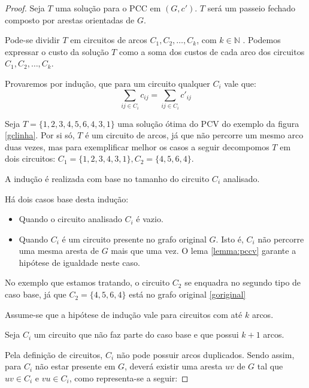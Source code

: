         \begin{proof} 
            Seja $T$ uma solução para o PCC em $(G, c')$. 
            $T$ será um passeio fechado composto por arestas orientadas de $G$.

            Pode-se dividir $T$ em circuitos de arcos $C_1, C_2, \dots, C_k$, com $k \in \mathbb{N}$ . %
            Podemos expressar o custo da solução $T$ como a soma dos custos de cada arco dos circuitos $C_1, C_2, \dots, C_k$. 

            Provaremos por indução, que para um circuito qualquer $C_i$ vale que:
            \[
                \sum_{ij \in C_i} c_{ij} = \sum_{ij \in C_i} c'_{ij}
            \]

            Seja $T = \{1, 2, 3, 4, 5, 6, 4, 3, 1\}$ uma solução ótima do PCV do exemplo da figura \ref{gclinha}.
            Por si só, $T$ é um circuito de arcos, já que não percorre um mesmo arco duas vezes, mas para exemplificar melhor os casos a seguir decompomos $T$ em dois circuitos: $C_1 = \{1, 2, 3, 4, 3, 1\}, C_2 = \{4, 5, 6, 4\}$.

            A indução é realizada com base no tamanho do circuito $C_i$ analisado.

            Há dois casos base desta indução:

            \begin{itemize}
                \item Quando o circuito analisado $C_i$ é vazio.
                \item Quando $C_i$ é um circuito presente no grafo original $G$. 
                    Isto é, $C_i$ não percorre uma mesma aresta de $G$ mais que uma vez.
                    O lema \ref{lemma:pccv} garante a hipótese de igualdade neste caso.
            \end{itemize}

            No exemplo que estamos tratando, o circuito $C_2$ se enquadra no segundo tipo de caso base, já que $C_2 = \{4, 5, 6, 4\}$ está no grafo original \ref{goriginal}

            Assume-se que a hipótese de indução vale para circuitos com até $k$ arcos.

            Seja $C_i$ um circuito que não faz parte do caso base e que possui $k+1$ arcos.

            Pela definição de circuitos, $C_i$ não pode possuir arcos duplicados.  
            Sendo assim, para $C_i$ não estar presente em $G$, deverá existir uma aresta $uv$ de $G$ tal que $uv \in C_i$ e $vu \in C_i$, como representa-se a seguir:


\end{proof}
